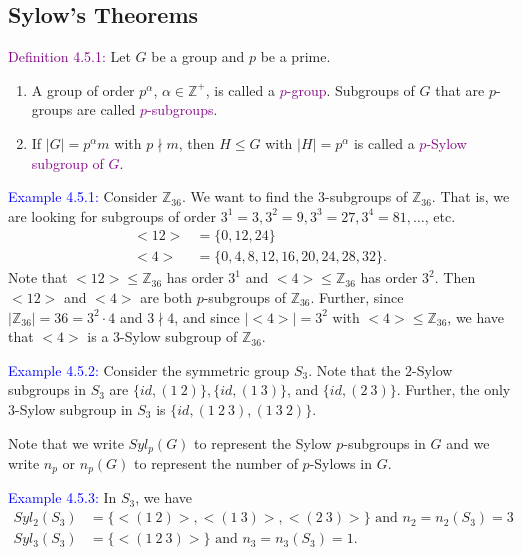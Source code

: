 \documentclass{article}
\begin{document}
\subsection{Sylow's Theorems}
\textcolor{purple}{Definition 4.5.1:} Let $G$ be a group and $p$ be a prime.
\begin{enumerate}
    \item A group of order $p^{\alpha}$, $\alpha \in \mathbb{Z}^+$, is called a \textcolor{purple}{$p$-group}. Subgroups of $G$ that are 
    $p$-groups are called \textcolor{purple}{$p$-subgroups}.
    \item If $|G|=p^{\alpha}m$ with $p \nmid m$, then $H \leq G$ with $|H|=p^{\alpha}$ is called a \textcolor{purple}{$p$-Sylow subgroup 
    of $G$}.
\end{enumerate}
\textcolor{blue}{Example 4.5.1:} Consider $\mathbb{Z}_{36}$. We want to find the $3$-subgroups of $\mathbb{Z}_{36}$. That is, we are 
looking for subgroups of order $3^1=3, 3^2=9, 3^3 = 27, 3^4=81, \dots$, etc.
\begin{align*}
    <12> &= \{0,12,24\} \\
    <4> &= \{0,4,8,12,16,20,24,28,32\}.
\end{align*}
Note that $<12> \leq \mathbb{Z}_{36}$ has order $3^1$ and $<4> \leq \mathbb{Z}_{36}$ has order $3^2$. Then $<12>$ and $<4>$ are both 
$p$-subgroups of $\mathbb{Z}_{36}$. Further, since $|\mathbb{Z}_{36}|=36 = 3^2 \cdot 4$ and $3 \nmid 4$, and since $|<4>| = 3^2$ with 
$<4> \leq \mathbb{Z}_{36}$, we have that $<4>$ is a $3$-Sylow subgroup of $\mathbb{Z}_{36}$.

\textcolor{blue}{Example 4.5.2:} Consider the symmetric group $S_3$. Note that the $2$-Sylow subgroups in $S_3$ are 
$\{id, (1 \ 2)\}, \{id, (1 \ 3)\}$, and $\{id, (2 \ 3)\}$. Further, the only $3$-Sylow subgroup in $S_3$ is 
$\{id, (1 \ 2 \ 3), (1 \ 3 \ 2)\}$.

Note that we write $Syl_p(G)$ to represent the Sylow $p$-subgroups in $G$ and we write $n_p$ or $n_p(G)$ to represent the number of 
$p$-Sylows in $G$. 

\textcolor{blue}{Example 4.5.3:} In $S_3$, we have
\begin{align*}
    Syl_2(S_3) &= \{<(1 \ 2)>, <(1 \ 3)>, <(2 \ 3)>\} \text{ and } n_2 = n_2(S_3) = 3 \\
    Syl_3(S_3) &= \{<( 1 \ 2 \ 3)>\} \text{ and } n_3 = n_3(S_3) = 1.
\end{align*}
\end{document}
